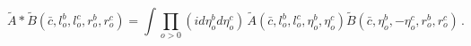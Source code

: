 \begin{equation}
{\tilde{A}}\ast {\tilde{B}}(\bar{c}%
,l_{o}^{b},l_{o}^{c},r_{o}^{b},r_{o}^{c})=\int \prod_{o>0}\left( id\eta
_{o}^{b}d\eta _{o}^{c}\right) \,{\tilde{A}}(\bar{c},l_{o}^{b},l_{o}^{c},\eta
_{o}^{b},\eta _{o}^{c}){\tilde{B}}(\bar{c},\eta _{o}^{b},-\eta
_{o}^{c},r_{o}^{b},r_{o}^{c})\,.
\end{equation}

